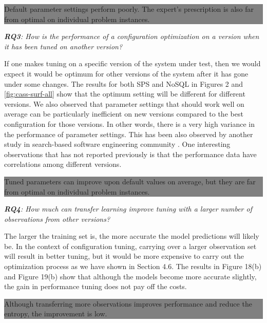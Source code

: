 \documentclass[letter]{vldb}
\begin{document}
\vspace{1em}
\colorbox{gray}{
	\begin{minipage}{\dimexpr0.88\columnwidth}
		 Default parameter settings perform poorly. The expert's prescription is also far from optimal on individual problem instances.
	\end{minipage}	
}
\vspace{1em}

{\noindent \em \textbf{RQ3}: How is the performance of a configuration optimization on a version when it has been tuned on another version?}

If one makes tuning on a specific version of the system under test, then we would expect it would be optimum for other versions of the system after it has gone under some changes. The results for both SPS and NoSQL in Figures 2 and \ref{fig:cass-surf-all} show that the optimum setting will be different for different versions. We also observed that parameter settings that should work well on average can be particularly inefficient on new versions compared to the best configuration for those versions. In other words, there is a very high variance in the performance of parameter settings. This has been also observed by another study in search-based software engineering community \cite{arcuri2013parameter}. One interesting observations that has not reported previously is that the performance data have correlations among different versions.

\vspace{1em}
\colorbox{gray}{
	\begin{minipage}{\dimexpr0.88\columnwidth}
		 Tuned parameters can improve upon default values on average, but they are far from optimal on individual problem instances.
	\end{minipage}	
}
\vspace{1em}

{\noindent \em \textbf{RQ4}: How much can transfer learning improve tuning with a larger number of observations from other versions?}

The larger the training set is, the more accurate the model predictions will likely be. In the context of configuration tuning, carrying over a larger observation set will result in better tuning, but it would be more expensive to carry out the optimization process as we have shown in Section 4.6. The results in Figure 18(b) and Figure 19(b) show that although the models become more accurate slightly, the gain in performance tuning does not pay off the costs.

\vspace{1em}
\colorbox{gray}{
	\begin{minipage}{\dimexpr0.88\columnwidth}
		 Although transferring more observations improves performance and reduce the entropy, the improvement is low.
	\end{minipage}	
}




\end{document}
